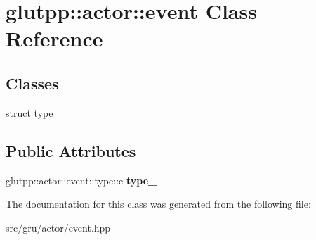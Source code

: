 \hypertarget{classglutpp_1_1actor_1_1event}{\section{glutpp\-:\-:actor\-:\-:event \-Class \-Reference}
\label{classglutpp_1_1actor_1_1event}
}
\subsection*{\-Classes}
\begin{DoxyCompactItemize}
\item 
struct \hyperlink{structglutpp_1_1actor_1_1event_1_1type}{type}
\end{DoxyCompactItemize}
\subsection*{\-Public \-Attributes}
\begin{DoxyCompactItemize}
\item 
\hypertarget{classglutpp_1_1actor_1_1event_a883a5571e9073d16d31f085b2f6b0316}{glutpp\-::actor\-::event\-::type\-::e {\bfseries type\-\_\-}}\label{classglutpp_1_1actor_1_1event_a883a5571e9073d16d31f085b2f6b0316}

\end{DoxyCompactItemize}


\-The documentation for this class was generated from the following file\-:\begin{DoxyCompactItemize}
\item 
src/gru/actor/event.\-hpp\end{DoxyCompactItemize}
